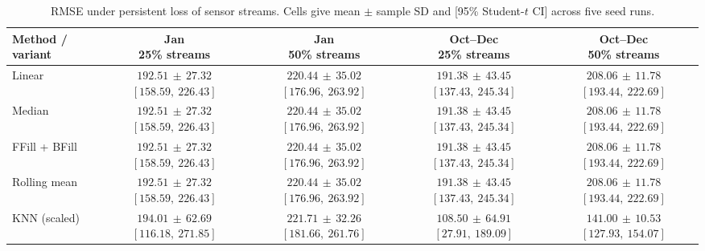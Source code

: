 \clearpage

\begin{table}[htbp]
\centering
\caption{{RMSE under persistent loss of sensor streams. Cells give mean $\pm$ sample SD and [95\% Student-$t$ CI] across five seed runs.}}
\label{tab:p03_A2}
\begingroup
\footnotesize
\setlength{\tabcolsep}{3pt}
\renewcommand{\arraystretch}{1.15}
\begin{tabular}{lcccc}
\toprule
Method / variant & \makecell{Jan\\25\% streams} & \makecell{Jan\\50\% streams} & \makecell{Oct--Dec\\25\% streams} & \makecell{Oct--Dec\\50\% streams} \\
\midrule
Linear & \makecell[c]{$192.51\,\pm\,27.32$\\$[158.59,\ 226.43]$} & \makecell[c]{$220.44\,\pm\,35.02$\\$[176.96,\ 263.92]$} & \makecell[c]{$191.38\,\pm\,43.45$\\$[137.43,\ 245.34]$} & \makecell[c]{$208.06\,\pm\,11.78$\\$[193.44,\ 222.69]$} \\
Median & \makecell[c]{$192.51\,\pm\,27.32$\\$[158.59,\ 226.43]$} & \makecell[c]{$220.44\,\pm\,35.02$\\$[176.96,\ 263.92]$} & \makecell[c]{$191.38\,\pm\,43.45$\\$[137.43,\ 245.34]$} & \makecell[c]{$208.06\,\pm\,11.78$\\$[193.44,\ 222.69]$} \\
FFill + BFill & \makecell[c]{$192.51\,\pm\,27.32$\\$[158.59,\ 226.43]$} & \makecell[c]{$220.44\,\pm\,35.02$\\$[176.96,\ 263.92]$} & \makecell[c]{$191.38\,\pm\,43.45$\\$[137.43,\ 245.34]$} & \makecell[c]{$208.06\,\pm\,11.78$\\$[193.44,\ 222.69]$} \\
Rolling mean & \makecell[c]{$192.51\,\pm\,27.32$\\$[158.59,\ 226.43]$} & \makecell[c]{$220.44\,\pm\,35.02$\\$[176.96,\ 263.92]$} & \makecell[c]{$191.38\,\pm\,43.45$\\$[137.43,\ 245.34]$} & \makecell[c]{$208.06\,\pm\,11.78$\\$[193.44,\ 222.69]$} \\
KNN (scaled) & \makecell[c]{$194.01\,\pm\,62.69$\\$[116.18,\ 271.85]$} & \makecell[c]{$221.71\,\pm\,32.26$\\$[181.66,\ 261.76]$} & \makecell[c]{$108.50\,\pm\,64.91$\\$[27.91,\ 189.09]$} & \makecell[c]{$141.00\,\pm\,10.53$\\$[127.93,\ 154.07]$} \\

\end{tabular}
\end{table}
